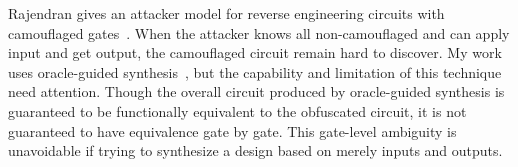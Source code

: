 \documentclass[thesis]{umassthesis}  %
\begin{document}
Rajendran gives an attacker model for reverse engineering circuits with camouflaged gates~\cite{rajendran-12}. When the attacker knows all non-camouflaged and can apply input and get output, the camouflaged circuit remain hard to discover. My work uses oracle-guided synthesis~\cite{jha2010oracle}, but the capability and limitation of this technique need attention. Though the overall circuit produced by oracle-guided synthesis is guaranteed to be functionally equivalent to the obfuscated circuit, it is not guaranteed to have equivalence gate by gate. This gate-level ambiguity is unavoidable if trying to synthesize a design based on merely inputs and outputs.



\end{document}
